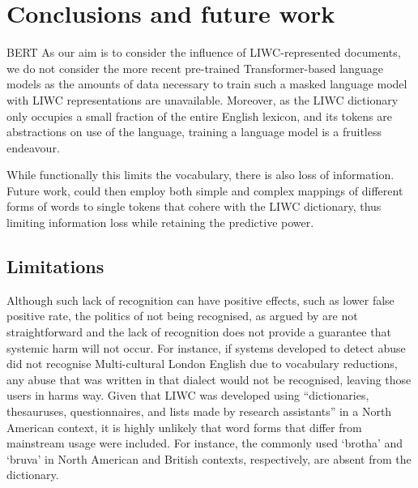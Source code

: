 \section{Conclusions and future work}

BERT \cite{Koufakou,Vidgen,Tran:2020,Isaksen:2020}
As our aim is to consider the influence of LIWC-represented documents, we do not consider the more recent pre-trained Transformer-based language models \citep[e.g.]{Devlin:2019,Liu:2019} as the amounts of data necessary to train such a masked language model with LIWC representations are unavailable. Moreover, as the LIWC dictionary only occupies a small fraction of the entire English lexicon, and its tokens are abstractions on use of the language, training a language model is a fruitless endeavour.


While functionally this limits the vocabulary, there is also loss of information. Future work, could then employ both simple and complex mappings of different forms of words to single tokens that cohere with the LIWC dictionary, thus limiting information loss while retaining the predictive power.

\subsection{Limitations}
Although such lack of recognition can have positive effects, such as lower false positive rate, the politics of not being recognised, as argued by \citet{Benjamin:2019} are not straightforward and the lack of recognition does not provide a guarantee that systemic harm will not occur. For instance, if systems developed to detect abuse did not recognise Multi-cultural London English due to vocabulary reductions, any abuse that was written in that dialect would not be recognised, leaving those users in harms way. Given that LIWC was developed using ``dictionaries, thesauruses, questionnaires, and lists made by research assistants'' \citep{Tauscik:2010} in a North American context, it is highly unlikely that word forms that differ from mainstream usage were included. For instance, the commonly used `brotha' and `bruva' in North American and British contexts, respectively, are absent from the dictionary.
